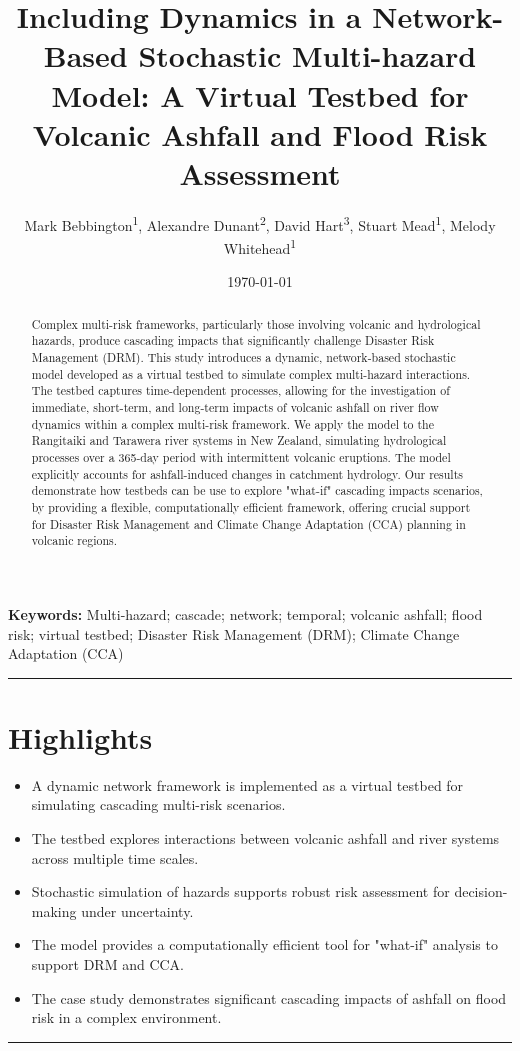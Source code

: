 \documentclass[12pt, a4paper]{article}
\title{\textbf{Including Dynamics in a Network-Based Stochastic Multi-hazard Model: A Virtual Testbed for Volcanic Ashfall and Flood Risk Assessment}}
\author{Mark Bebbington\textsuperscript{1}, 
Alexandre Dunant\textsuperscript{2}, 
David Hart\textsuperscript{3}, 
Stuart Mead\textsuperscript{1}, 
Melody Whitehead\textsuperscript{1}}
\date{\today}
\begin{document}
\maketitle

\begin{abstract}
\noindent Complex multi-risk frameworks, particularly those involving volcanic and hydrological hazards, produce cascading impacts that significantly challenge Disaster Risk Management (DRM). This study introduces a dynamic, network-based stochastic model developed as a virtual testbed to simulate complex multi-hazard interactions. The testbed captures time-dependent processes, allowing for the investigation of immediate, short-term, and long-term impacts of volcanic ashfall on river flow dynamics within a complex multi-risk framework. We apply the model to the Rangitaiki and Tarawera river systems in New Zealand, simulating hydrological processes over a 365-day period with intermittent volcanic eruptions. The model explicitly accounts for ashfall-induced changes in catchment hydrology. Our results demonstrate how testbeds can be use to explore "what-if" cascading impacts scenarios, by providing a flexible, computationally efficient framework, offering crucial support for Disaster Risk Management and Climate Change Adaptation (CCA) planning in volcanic regions.
\end{abstract}

\noindent\textbf{Keywords:} Multi-hazard; cascade; network; temporal; volcanic ashfall; flood risk; virtual testbed; Disaster Risk Management (DRM); Climate Change Adaptation (CCA)

\hrule

\section*{Highlights}
\begin{itemize}
    \item A dynamic network framework is implemented as a virtual testbed for simulating cascading multi-risk scenarios.
    \item The testbed explores interactions between volcanic ashfall and river systems across multiple time scales.
    \item Stochastic simulation of hazards supports robust risk assessment for decision-making under uncertainty.
    \item The model provides a computationally efficient tool for "what-if" analysis to support DRM and CCA.
    \item The case study demonstrates significant cascading impacts of ashfall on flood risk in a complex environment.
\end{itemize}
\hrule
\end{document}
